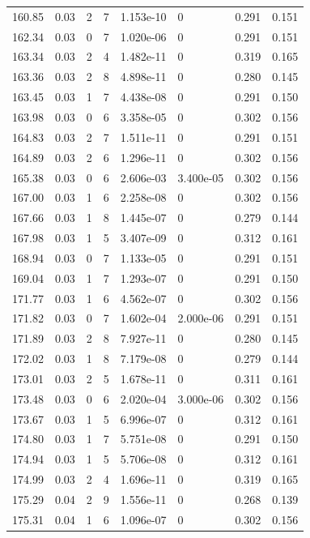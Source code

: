 \documentclass[preview]{standalone}
\begin{document}
{{{{{{{\begin{tabular}{L{1.2cm}C{1.2cm} C{0.3cm}C{0.5cm} C{1.4cm}C{1.4cm} C{1.4cm}C{1.4cm}}
  160.85  &  0.03  & 2     &  7 &  1.153e-10  & 0  & 0.291 &  0.151   \\ 
  162.34  &  0.03  & 0     &  7 &  1.020e-06  & 0  & 0.291 &  0.151   \\ 
  163.34  &  0.03  & 2     &  4 &  1.482e-11  & 0  & 0.319 &  0.165   \\ 
  163.36  &  0.03  & 2     &  8 &  4.898e-11  & 0  & 0.280 &  0.145   \\ 
  163.45  &  0.03  & 1     &  7 &  4.438e-08  & 0  & 0.291 &  0.150   \\ 
  163.98  &  0.03  & 0     &  6 &  3.358e-05  & 0  & 0.302 &  0.156   \\ 
  164.83  &  0.03  & 2     &  7 &  1.511e-11  & 0  & 0.291 &  0.151   \\ 
  164.89  &  0.03  & 2     &  6 &  1.296e-11  & 0  & 0.302 &  0.156   \\ 
  165.38  &  0.03  & 0     &  6 &  2.606e-03  & 3.400e-05  & 0.302 &  0.156   \\ 
  167.00  &  0.03  & 1     &  6 &  2.258e-08  & 0  & 0.302 &  0.156   \\ 
  167.66  &  0.03  & 1     &  8 &  1.445e-07  & 0  & 0.279 &  0.144   \\ 
  167.98  &  0.03  & 1     &  5 &  3.407e-09  & 0  & 0.312 &  0.161   \\ 
  168.94  &  0.03  & 0     &  7 &  1.133e-05  & 0  & 0.291 &  0.151   \\ 
  169.04  &  0.03  & 1     &  7 &  1.293e-07  & 0  & 0.291 &  0.150   \\ 
  171.77  &  0.03  & 1     &  6 &  4.562e-07  & 0  & 0.302 &  0.156   \\ 
  171.82  &  0.03  & 0     &  7 &  1.602e-04  & 2.000e-06  & 0.291 &  0.151   \\ 
  171.89  &  0.03  & 2     &  8 &  7.927e-11  & 0  & 0.280 &  0.145   \\ 
  172.02  &  0.03  & 1     &  8 &  7.179e-08  & 0  & 0.279 &  0.144   \\ 
  173.01  &  0.03  & 2     &  5 &  1.678e-11  & 0  & 0.311 &  0.161   \\ 
  173.48  &  0.03  & 0     &  6 &  2.020e-04  & 3.000e-06  & 0.302 &  0.156   \\ 
  173.67  &  0.03  & 1     &  5 &  6.996e-07  & 0  & 0.312 &  0.161   \\ 
  174.80  &  0.03  & 1     &  7 &  5.751e-08  & 0  & 0.291 &  0.150   \\ 
  174.94  &  0.03  & 1     &  5 &  5.706e-08  & 0  & 0.312 &  0.161   \\ 
  174.99  &  0.03  & 2     &  4 &  1.696e-11  & 0  & 0.319 &  0.165   \\ 
  175.29  &  0.04  & 2     &  9 &  1.556e-11  & 0  & 0.268 &  0.139   \\ 
  175.31  &  0.04  & 1     &  6 &  1.096e-07  & 0  & 0.302 &  0.156   \\ 
\hline 
\end{tabular} 

}}}}}}}
\end{document}
